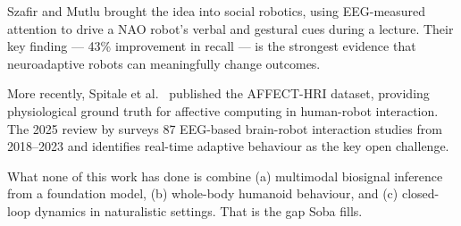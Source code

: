 \documentclass[11pt,a4paper]{article}
\begin{document}
Szafir and Mutlu \cite{szafir2012} brought the idea into social robotics, using EEG-measured attention to drive a NAO robot's verbal and gestural cues during a lecture. Their key finding --- 43\% improvement in recall --- is the strongest evidence that neuroadaptive robots can meaningfully change outcomes.

More recently, Spitale et al.\ \cite{affecthri2024} published the AFFECT-HRI dataset, providing physiological ground truth for affective computing in human-robot interaction. The 2025 review by \cite{mindmeetsrobots2025} surveys 87 EEG-based brain-robot interaction studies from 2018--2023 and identifies real-time adaptive behaviour as the key open challenge.

What none of this work has done is combine (a) multimodal biosignal inference from a foundation model, (b) whole-body humanoid behaviour, and (c) closed-loop dynamics in naturalistic settings. That is the gap Soba fills.
\end{document}
